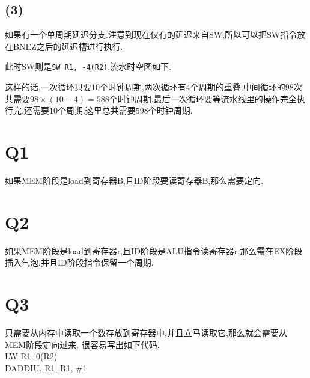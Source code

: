 \documentclass[adobefonts, nocap]{ctexart}
\begin{document}
    \subsection*{(3)}
      如果有一个单周期延迟分支.注意到现在仅有的延迟来自SW,所以可以把SW指令放在BNEZ之后的延迟槽进行执行.

      此时SW则是\texttt{SW R1, -4(R2)}.流水时空图如下.

      这样的话,一次循环只要$10$个时钟周期,两次循环有$4$个周期的重叠,中间循环的$98$次共需要$98\times (10-4)=588$个时钟周期.最后一次循环要等流水线里的操作完全执行完,还需要$10$个周期.这里总共需要$598$个时钟周期.

      {\footnotesize
      }
  \section*{Q1}
    如果MEM阶段是load到寄存器B,且ID阶段要读寄存器B,那么需要定向.
  \section*{Q2}
    如果MEM阶段是load到寄存器r,且ID阶段是ALU指令读寄存器r,那么需在EX阶段插入气泡,并且ID阶段指令保留一个周期.
  \section*{Q3}
    只需要从内存中读取一个数存放到寄存器中,并且立马读取它,那么就会需要从MEM阶段定向过来.
    很容易写出如下代码. \\
    LW R1, 0(R2) \\
    DADDIU, R1, R1, \#1
\end{document}
